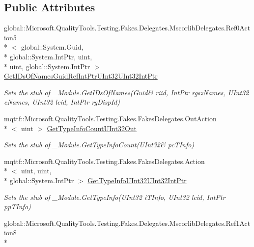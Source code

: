 \subsection*{Public Attributes}
\begin{DoxyCompactItemize}
\item 
global\-::\-Microsoft.\-Quality\-Tools.\-Testing.\-Fakes.\-Delegates.\-Mscorlib\-Delegates.\-Ref0\-Action5\\*
$<$ global\-::\-System.\-Guid, \\*
global\-::\-System.\-Int\-Ptr, uint, \\*
uint, global\-::\-System.\-Int\-Ptr $>$ \hyperlink{class_system_1_1_runtime_1_1_interop_services_1_1_fakes_1_1_stub___module_a1e2af23ad0f31b09f481439cc5841d26}{Get\-I\-Ds\-Of\-Names\-Guid\-Ref\-Int\-Ptr\-U\-Int32\-U\-Int32\-Int\-Ptr}
\begin{DoxyCompactList}\small\item\em Sets the stub of \-\_\-\-Module.\-Get\-I\-Ds\-Of\-Names(Guid\& riid, Int\-Ptr rgsz\-Names, U\-Int32 c\-Names, U\-Int32 lcid, Int\-Ptr rg\-Disp\-Id)\end{DoxyCompactList}\item 
mqttf\-::\-Microsoft.\-Quality\-Tools.\-Testing.\-Fakes.\-Fakes\-Delegates.\-Out\-Action\\*
$<$ uint $>$ \hyperlink{class_system_1_1_runtime_1_1_interop_services_1_1_fakes_1_1_stub___module_a280ffd7d37787c82b9b2478420b08f80}{Get\-Type\-Info\-Count\-U\-Int32\-Out}
\begin{DoxyCompactList}\small\item\em Sets the stub of \-\_\-\-Module.\-Get\-Type\-Info\-Count(U\-Int32\& pc\-T\-Info)\end{DoxyCompactList}\item 
mqttf\-::\-Microsoft.\-Quality\-Tools.\-Testing.\-Fakes.\-Fakes\-Delegates.\-Action\\*
$<$ uint, uint, \\*
global\-::\-System.\-Int\-Ptr $>$ \hyperlink{class_system_1_1_runtime_1_1_interop_services_1_1_fakes_1_1_stub___module_affc77e51393759427ddbd2719bb0e9aa}{Get\-Type\-Info\-U\-Int32\-U\-Int32\-Int\-Ptr}
\begin{DoxyCompactList}\small\item\em Sets the stub of \-\_\-\-Module.\-Get\-Type\-Info(\-U\-Int32 i\-T\-Info, U\-Int32 lcid, Int\-Ptr pp\-T\-Info)\end{DoxyCompactList}\item 
global\-::\-Microsoft.\-Quality\-Tools.\-Testing.\-Fakes.\-Delegates.\-Mscorlib\-Delegates.\-Ref1\-Action8\\*

\end{DoxyCompactItemize}
